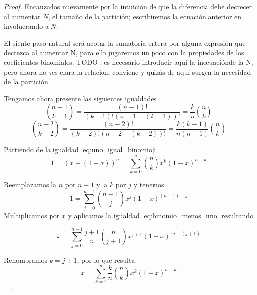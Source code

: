 \begin{proof}

    Encauzados nuevamente por la intuición de que la diferencia debe decrecer al aumentar $N$,
     el tamaño de la partición;
    escribiremos la ecuación anterior en involucrando a $N$. 



    El siente paso natural será acotar la sumatoria entera por alguna expresión que decrezca al aumentar N, para ello jugaremos un poco con la propiedades de los coeficientes binomiales. 
    TODO : es necesario introducir aquí la inecuaciónde la N, pero ahora no ves clara la relación, conviene 
    y quizás de aquí surgen la necesidad de la partición. 
   

    Tengamos ahora presente las siguientes igualdades 
    \begin{equation} \label{eq:binomio_menos_uno}
        \binom{n-1}{k-1} = \frac{(n-1)!}{(k-1)! (n-1-(k-1))!} = \frac{k}{n} \binom{n}{k}
    \end{equation}
    \begin{equation} \label{eq:binomio_menos_dos}
        \binom{n-2}{k-2} = \frac{(n-2)!}{(k-2)! (n-2-(k-2))!} = \frac{k(k-1)}{n(n-1)} \binom{n}{k}
    \end{equation}

    Partiendo de la igualdad \eqref{eq:uno_igual_binomio}:
    \begin{equation}
        1 = (x+ (1-x))^n = \sum_{k=0}^n \binom{n}{k} x^{k} (1-x)^{n-k}
    \end{equation}

    Reemplazamos la $n$ por $n-1$ y la $k$ por $j$ y tenemos 
    \begin{equation}
        1 = \sum_{j=0}^{n-1} \binom{n-1}{j} x^{j} (1-x)^{(n-1)-j}
    \end{equation}
    Multiplicamos por $x$ y aplicamos la igualdad \eqref{eq:binomio_menos_uno} resultando 

    \begin{equation}
        x = \sum_{j=0}^{n-1} \frac{j+1}{n} \binom{n}{j+1} x^{j+1} (1-x)^{(n-(j+1)}
    \end{equation}

    Renombramos $k= j+1$, por lo que resulta
    \begin{equation}
        x = \sum_{k=1}^{n} \frac{k}{n} \binom{n}{k} x^{k} (1-x)^{n-k}
    \end{equation}


\end{proof}
